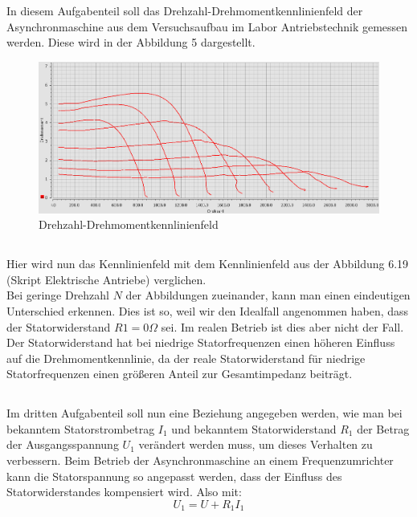 \chapter{}
\section{}
In diesem Aufgabenteil soll das Drehzahl-Drehmomentkennlinienfeld der Asynchronmaschine aus dem Versuchsaufbau im Labor Antriebstechnik gemessen werden. Diese wird in der Abbildung 5 dargestellt.
\begin{figure}[h]
	\centering
	\includegraphics[width=\textwidth]{./Bilder/ele3.png}
	\caption{Drehzahl-Drehmomentkennlinienfeld}
	\label{fig:7a}
\end{figure}

\section{}
Hier wird nun das Kennlinienfeld mit dem Kennlinienfeld aus der Abbildung 6.19 (Skript Elektrische Antriebe) verglichen.\\
Bei geringe Drehzahl $ N $ der Abbildungen zueinander, kann man einen eindeutigen Unterschied erkennen. Dies ist so, weil wir den Idealfall angenommen haben, dass der Statorwiderstand $ R1 = 0\Omega $ sei. Im realen Betrieb ist dies aber nicht der Fall. Der Statorwiderstand hat bei niedrige Statorfrequenzen einen höheren Einfluss auf die Drehmomentkennlinie, da der reale Statorwiderstand für niedrige Statorfrequenzen einen größeren Anteil zur Gesamtimpedanz beiträgt.

\section{}
Im dritten Aufgabenteil soll nun eine Beziehung angegeben werden, wie man bei bekanntem Statorstrombetrag $ I_{1} $ und bekanntem Statorwiderstand $ R_{1} $ der Betrag der Ausgangsspannung $ U_{1} $ verändert werden muss, um dieses Verhalten zu verbessern. Beim Betrieb der Asynchronmaschine an einem Frequenzumrichter kann die Statorspannung so angepasst werden, dass der Einfluss des Statorwiderstandes kompensiert wird. Also mit:
\begin{equation}
	U_{1} = U + R_{1}I_{1}
\end{equation}

